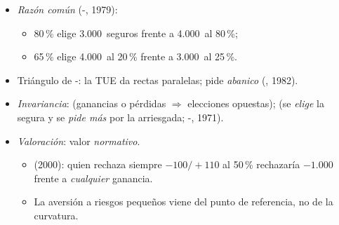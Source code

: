 \documentclass{article}
\begin{document}
\begin{columnas}
\begin{itemize}
\emph{Por qué}: $B_1=0{,}8\,B_2+0{,}2\,\delta_0$, y $0{,}8\,A_2+0{,}2\,\delta_0$ (110~con 0,76) domina a $A_1$: quien prefiere $B_2$ debe preferir $B_1$. Del 80\,\% al 100\,\% pesa más que del 75\,\% al 95\,\%.
\item \emph{Razón común} (-, 1979):
  \begin{itemize}
  \item 80\,\% elige 3.000~seguros frente a 4.000~al 80\,\%;
  \item 65\,\% elige 4.000~al 20\,\% frente a 3.000~al 25\,\%.
  \end{itemize}
\item Triángulo de -: la TUE da rectas paralelas;  pide \emph{abanico} (, 1982).
\item \emph{Invariancia}:  (ganancias o pérdidas $\Rightarrow$ elecciones opuestas);  (se \emph{elige} la segura y se \emph{pide más} por la arriesgada; -, 1971).
\item \emph{Valoración}: valor \emph{normativo}.
  \begin{itemize}
  \item {} (2000): quien rechaza siempre $-100/+110$ al 50\,\% rechazaría $-1.000$ frente a \emph{cualquier} ganancia.
  \item La aversión a riesgos pequeños viene del punto de referencia, no de la curvatura.
  \end{itemize}
\end{itemize}


\end{columnas}
\end{document}
